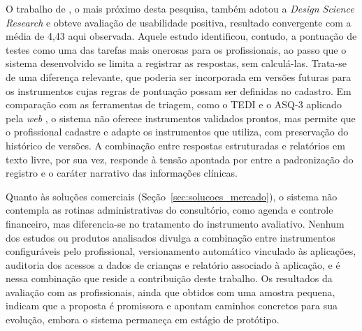 O trabalho de , o mais próximo desta pesquisa, também adotou a \textit{Design Science Research} e obteve avaliação de usabilidade positiva, resultado convergente com a média de 4,43 aqui observada. Aquele estudo identificou, contudo, a pontuação de testes como uma das tarefas mais onerosas para os profissionais, ao passo que o sistema desenvolvido se limita a registrar as respostas, sem calculá-las. Trata-se de uma diferença relevante, que poderia ser incorporada em versões futuras para os instrumentos cujas regras de pontuação possam ser definidas no cadastro. Em comparação com as ferramentas de triagem, como o TEDI \cite{moreira2022_tedi} e o ASQ-3 aplicado pela \textit{web} \cite{schonhaut2023_asq_web}, o sistema não oferece instrumentos validados prontos, mas permite que o profissional cadastre e adapte os instrumentos que utiliza, com preservação do histórico de versões. A combinação entre respostas estruturadas e relatórios em texto livre, por sua vez, responde à tensão apontada por  entre a padronização do registro e o caráter narrativo das informações clínicas.

Quanto às soluções comerciais (Seção~\ref{sec:solucoes_mercado}), o sistema não contempla as rotinas administrativas do consultório, como agenda e controle financeiro, mas diferencia-se no tratamento do instrumento avaliativo. Nenhum dos estudos ou produtos analisados divulga a combinação entre instrumentos configuráveis pelo profissional, versionamento automático vinculado às aplicações, auditoria dos acessos a dados de crianças e relatório associado à aplicação, e é nessa combinação que reside a contribuição deste trabalho. Os resultados da avaliação com as profissionais, ainda que obtidos com uma amostra pequena, indicam que a proposta é promissora e apontam caminhos concretos para sua evolução, embora o sistema permaneça em estágio de protótipo.